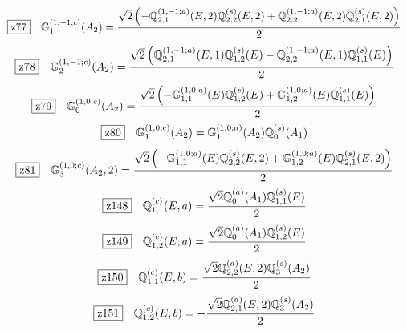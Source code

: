 \documentclass[fleqn,10pt,landscape]{jsarticle}
\begin{document}
\begin{dmath*}
\hspace*{3mm}\fbox{z77}\quad \mathbb{G}_{1}^{(1,-1;c)}(A_{2})=\frac{\sqrt{2} \left(- \mathbb{Q}_{2,1}^{(1,-1;a)}(E,2) \mathbb{Q}_{2,2}^{(s)}(E,2) + \mathbb{Q}_{2,2}^{(1,-1;a)}(E,2) \mathbb{Q}_{2,1}^{(s)}(E,2)\right)}{2}
\end{dmath*}
\begin{dmath*}
\hspace*{3mm}\fbox{z78}\quad \mathbb{G}_{2}^{(1,-1;c)}(A_{2})=\frac{\sqrt{2} \left(\mathbb{Q}_{2,1}^{(1,-1;a)}(E,1) \mathbb{Q}_{1,2}^{(s)}(E) - \mathbb{Q}_{2,2}^{(1,-1;a)}(E,1) \mathbb{Q}_{1,1}^{(s)}(E)\right)}{2}
\end{dmath*}
\begin{dmath*}
\hspace*{3mm}\fbox{z79}\quad \mathbb{G}_{0}^{(1,0;c)}(A_{2})=\frac{\sqrt{2} \left(- \mathbb{G}_{1,1}^{(1,0;a)}(E) \mathbb{Q}_{1,2}^{(s)}(E) + \mathbb{G}_{1,2}^{(1,0;a)}(E) \mathbb{Q}_{1,1}^{(s)}(E)\right)}{2}
\end{dmath*}
\begin{dmath*}
\hspace*{3mm}\fbox{z80}\quad \mathbb{G}_{1}^{(1,0;c)}(A_{2})=\mathbb{G}_{1}^{(1,0;a)}(A_{2}) \mathbb{Q}_{0}^{(s)}(A_{1})
\end{dmath*}
\begin{dmath*}
\hspace*{3mm}\fbox{z81}\quad \mathbb{G}_{3}^{(1,0;c)}(A_{2},2)=\frac{\sqrt{2} \left(- \mathbb{G}_{1,1}^{(1,0;a)}(E) \mathbb{Q}_{2,2}^{(s)}(E,2) + \mathbb{G}_{1,2}^{(1,0;a)}(E) \mathbb{Q}_{2,1}^{(s)}(E,2)\right)}{2}
\end{dmath*}
\begin{dmath*}
\hspace*{3mm}\fbox{z148}\quad \mathbb{Q}_{1,1}^{(c)}(E,a)=\frac{\sqrt{2} \mathbb{Q}_{0}^{(a)}(A_{1}) \mathbb{Q}_{1,1}^{(s)}(E)}{2}
\end{dmath*}
\begin{dmath*}
\hspace*{3mm}\fbox{z149}\quad \mathbb{Q}_{1,2}^{(c)}(E,a)=\frac{\sqrt{2} \mathbb{Q}_{0}^{(a)}(A_{1}) \mathbb{Q}_{1,2}^{(s)}(E)}{2}
\end{dmath*}
\begin{dmath*}
\hspace*{3mm}\fbox{z150}\quad \mathbb{Q}_{1,1}^{(c)}(E,b)=\frac{\sqrt{2} \mathbb{Q}_{2,2}^{(a)}(E,2) \mathbb{Q}_{3}^{(s)}(A_{2})}{2}
\end{dmath*}
\begin{dmath*}
\hspace*{3mm}\fbox{z151}\quad \mathbb{Q}_{1,2}^{(c)}(E,b)=- \frac{\sqrt{2} \mathbb{Q}_{2,1}^{(a)}(E,2) \mathbb{Q}_{3}^{(s)}(A_{2})}{2}
\end{dmath*}
\end{document}
